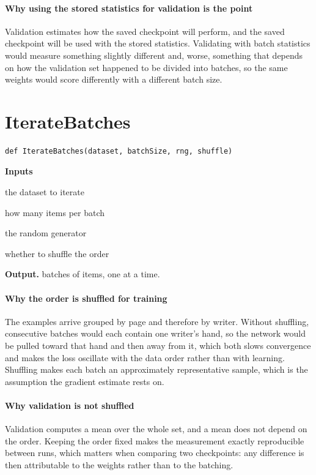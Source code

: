 \paragraph{Why using the stored statistics for validation is the point}
Validation estimates how the saved checkpoint will perform, and the saved checkpoint will be used with the stored statistics. Validating with batch statistics would measure something slightly different and, worse, something that depends on how the validation set happened to be divided into batches, so the same weights would score differently with a different batch size.


\section{IterateBatches}
\begin{lstlisting}[style=sig]
def IterateBatches(dataset, batchSize, rng, shuffle)
\end{lstlisting}

\noindent\textbf{Inputs}
\begin{description}[leftmargin=2.2em,style=nextline,font=\normalfont\ttfamily]\setlength\itemsep{1pt}
  \item[{dataset}] \normalfont the dataset to iterate
  \item[{batchSize}] \normalfont how many items per batch
  \item[{rng}] \normalfont the random generator
  \item[{shuffle}] \normalfont whether to shuffle the order
\end{description}

\noindent\textbf{Output.} batches of items, one at a time.


\paragraph{Why the order is shuffled for training}
The examples arrive grouped by page and therefore by writer. Without shuffling, consecutive batches would each contain one writer's hand, so the network would be pulled toward that hand and then away from it, which both slows convergence and makes the loss oscillate with the data order rather than with learning. Shuffling makes each batch an approximately representative sample, which is the assumption the gradient estimate rests on.


\paragraph{Why validation is not shuffled}
Validation computes a mean over the whole set, and a mean does not depend on the order. Keeping the order fixed makes the measurement exactly reproducible between runs, which matters when comparing two checkpoints: any difference is then attributable to the weights rather than to the batching.


